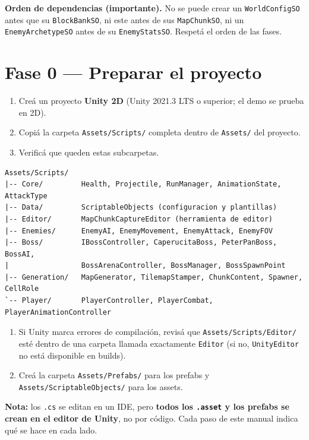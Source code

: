 \documentclass[a4paper,12pt]{article}
\newcommand{\code}[1]{\texttt{#1}}
\begin{document}
\textbf{Orden de dependencias (importante).} No se puede crear un \code{WorldConfigSO} antes que
su \code{BlockBankSO}, ni este antes de sus \code{MapChunkSO}, ni un \code{EnemyArchetypeSO}
antes de su \code{EnemyStatsSO}. Respetá el orden de las fases.

\section{Fase 0 --- Preparar el proyecto}

\begin{enumerate}
    \item Creá un proyecto \textbf{Unity 2D} (Unity 2021.3 LTS o superior; el demo se prueba en 2D).
    \item Copiá la carpeta \code{Assets/Scripts/} completa dentro de \code{Assets/} del proyecto.
    \item Verificá que queden estas subcarpetas.
\end{enumerate}

\begin{verbatim}
Assets/Scripts/
|-- Core/         Health, Projectile, RunManager, AnimationState, AttackType
|-- Data/         ScriptableObjects (configuracion y plantillas)
|-- Editor/       MapChunkCaptureEditor (herramienta de editor)
|-- Enemies/      EnemyAI, EnemyMovement, EnemyAttack, EnemyFOV
|-- Boss/         IBossController, CaperucitaBoss, PeterPanBoss, BossAI,
|                 BossArenaController, BossManager, BossSpawnPoint
|-- Generation/   MapGenerator, TilemapStamper, ChunkContent, Spawner, CellRole
`-- Player/       PlayerController, PlayerCombat, PlayerAnimationController
\end{verbatim}

\begin{enumerate}[resume]
    \item Si Unity marca errores de compilación, revisá que \code{Assets/Scripts/Editor/} esté
    dentro de una carpeta llamada exactamente \code{Editor} (si no, \code{UnityEditor} no está
    disponible en builds).
    \item Creá la carpeta \code{Assets/Prefabs/} para los prefabs y
    \code{Assets/ScriptableObjects/} para los assets.
\end{enumerate}

\textbf{Nota:} los \code{.cs} se editan en un IDE, pero \textbf{todos los \code{.asset} y los
prefabs se crean en el editor de Unity}, no por código. Cada paso de este manual indica qué se
hace en cada lado.
\end{document}
